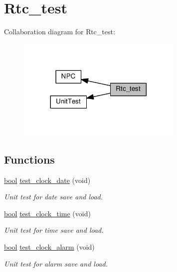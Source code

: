 \hypertarget{group__rtc__test}{}\section{Rtc\+\_\+test}
\label{group__rtc__test}
Collaboration diagram for Rtc\+\_\+test\+:\nopagebreak
\begin{figure}[H]
\begin{center}
\leavevmode
\includegraphics[width=224pt]{dc/d04/group__rtc__test}
\end{center}
\end{figure}
\subsection*{Functions}
\begin{DoxyCompactItemize}
\item 
\hyperlink{group___utils_gaf6a258d8f3ee5206d682d799316314b1}{bool} \hyperlink{group__rtc__test_gab7d696e67a3639eb9024bf75d16eb0af}{test\+\_\+clock\+\_\+date} (void)
\begin{DoxyCompactList}\small\item\em Unit test for date save and load. \end{DoxyCompactList}\item 
\hyperlink{group___utils_gaf6a258d8f3ee5206d682d799316314b1}{bool} \hyperlink{group__rtc__test_gaad71d331736202cb1f4e4611adc4017e}{test\+\_\+clock\+\_\+time} (void)
\begin{DoxyCompactList}\small\item\em Unit test for time save and load. \end{DoxyCompactList}\item 
\hyperlink{group___utils_gaf6a258d8f3ee5206d682d799316314b1}{bool} \hyperlink{group__rtc__test_ga29ed9f56622242ef59fcab012165f442}{test\+\_\+clock\+\_\+alarm} (void)
\begin{DoxyCompactList}\small\item\em Unit test for alarm save and load. \end{DoxyCompactList}\end{DoxyCompactItemize}


